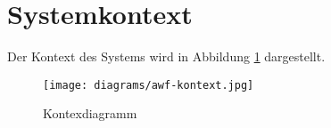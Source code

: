 \section{Systemkontext}
Der Kontext des Systems wird in Abbildung \ref{fig:kontext} dargestellt.

\begin{figure}
  \centering
  \texttt{[image: diagrams/awf-kontext.jpg]}
  \caption{Kontexdiagramm}
  \label{fig:kontext}
\end{figure}
